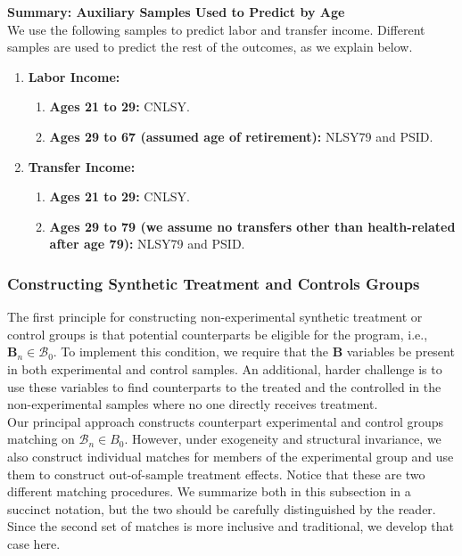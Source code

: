 \noindent \textbf{Summary: Auxiliary Samples Used to Predict by Age}\\
We use the following samples to predict labor and transfer income. Different samples are used to predict the rest of the outcomes, as we explain below.
\begin{enumerate}
\item \textbf{Labor Income:}
\begin{enumerate}
\item \textbf{Ages 21 to 29:} CNLSY.
\item \textbf{Ages 29 to 67 (assumed age of retirement):} NLSY79 and PSID.
\end{enumerate}
\item \textbf{Transfer Income:}
\begin{enumerate}
\item \textbf{Ages 21 to 29:} CNLSY.
\item \textbf{Ages 29 to 79 (we assume no transfers other than health-related after age 79):} NLSY79 and PSID.
\end{enumerate}
\end{enumerate}

\subsubsection{Constructing Synthetic Treatment and Controls Groups}\label{appendix:match}

\noindent The first principle for constructing non-experimental synthetic treatment or control groups is that potential counterparts be eligible for the program, i.e., $\bm{B}_n \in \mathcal{B}_{0}$. To implement this condition, we require that the $\bm{B}$ variables be present in both experimental and control samples. An additional, harder challenge is to use these variables to find counterparts to the treated and the controlled in the non-experimental samples where no one directly receives treatment.\\

\noindent Our principal approach constructs counterpart experimental and control groups matching on $\mathcal{B}_n \in B_0$. However, under exogeneity and structural invariance, we also construct individual matches for members of the experimental group and use them to construct out-of-sample treatment effects. Notice that these are two different matching procedures. We summarize both in this subsection in a succinct notation, but the two should be carefully distinguished by the reader. Since the second set of matches is more inclusive and traditional, we develop that case here.\\

